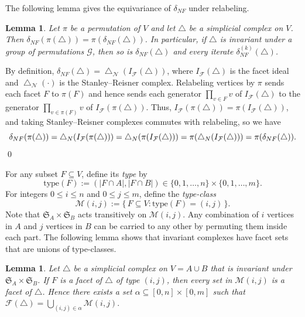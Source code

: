 \documentclass[12pt]{article}
\renewenvironment{proof}{{\noindent\bfseries Proof.}}{\qed}
\theoremstyle{plain}
\newtheorem{lemma}[theorem]{Lemma}
\theoremstyle{definition}
\newcommand{\F}{\mathcal{F}}
\newcommand{\IF}{I_{\F}}
\begin{document}
	The following lemma gives the equivariance of $\delta_{NF}$ under relabeling.
	\begin{lemma}\label{lem:equivariance}
		Let $\pi$ be a permutation of $V$ and let $\bigtriangleup$ be a simplicial complex on $V$.
		Then $\delta_{NF}(\pi(\bigtriangleup))=\pi(\delta_{NF}(\bigtriangleup))$. In particular, if $\bigtriangleup$ is invariant
		under a group of permutations $\mathcal{G}$, then so is $\delta_{NF}(\bigtriangleup)$ and every iterate
		$\delta_{NF}^{(k)}(\bigtriangleup)$.
	\end{lemma}
	
	\begin{proof}
		By definition, $\delta_{NF}(\bigtriangleup)=\bigtriangleup_{\mathcal{N}}(\IF(\bigtriangleup))$, where $\IF(\bigtriangleup)$ is the facet ideal
		and $\bigtriangleup_{\mathcal{N}}(\cdot)$ is the Stanley--Reisner complex. Relabeling vertices by $\pi$ sends each facet
		$F$ to $\pi(F)$ and hence sends each generator $\prod_{v\in F} v$ of $\IF(\bigtriangleup)$ to the generator
		$\prod_{v\in \pi(F)} v$ of $\IF(\pi(\bigtriangleup))$. Thus, $\IF(\pi(\bigtriangleup))=\pi(\IF(\bigtriangleup))$, and taking
		Stanley--Reisner complexes commutes with relabeling, so we have
		\[
		\delta_{NF}(\pi(\bigtriangleup))=\bigtriangleup_N(\IF(\pi(\bigtriangleup)))=\bigtriangleup_N(\pi(\IF(\bigtriangleup)))=\pi(\bigtriangleup_N(\IF(\bigtriangleup)))
		=\pi(\delta_{NF}(\bigtriangleup)).\qedhere
		\]
	\end{proof}
	
	\medskip
	For any subset $F\subseteq V$, define its \emph{type} by
	\[
	\mathrm{type}(F):=(|F\cap A|, |F\cap B|)\in\{0,1,\dots,n\}\times\{0,1,\dots,m\}.
	\]
	For integers $0\le i\le n$ and $0\le j\le m$, define the \emph{type-class}
	\[
	\mathcal{M}(i,j):=\{\,F\subseteq V : \mathrm{type}(F)=(i,j)\,\}.
	\]
	Note that $\mathfrak{S}_A\times\mathfrak{S}_B$ acts transitively on $\mathcal{M}(i,j)$. Any combination of $i$ vertices in $A$ and $j$ vertices in $B$ can be carried to any other by permuting them inside each part.
	The following lemma shows that invariant complexes have facet sets that are unions of type-classes.
	\begin{lemma}\label{lem:type-union}
		Let $\bigtriangleup$ be a simplicial complex on $V=A\cup B$ that is invariant under
		$\mathfrak{S}_A\times \mathfrak{S}_B$. If $F$ is a facet of $\bigtriangleup$ of type $(i,j)$,
		then \emph{every} set in $\mathcal{M}(i,j)$ is a facet of $\bigtriangleup$. Hence there exists
		a set $\alpha\subseteq[0,n]\times[0,m]$ such that $\mathcal{F}(\bigtriangleup)=\bigcup_{(i,j)\in\alpha}\mathcal{M}(i,j).$ 
	\end{lemma}
	
\end{document}
